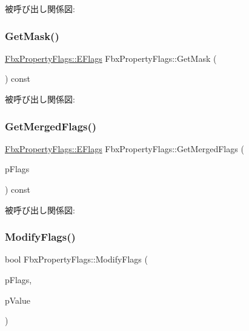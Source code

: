被呼び出し関係図\+:
\mbox{\label{class_fbx_property_flags_a041432d0cdbc9a1fd7c1b9b720cbf816}} 
\subsubsection{\texorpdfstring{Get\+Mask()}{GetMask()}}
{\footnotesize\ttfamily \hyperlink{class_fbx_property_flags_afabfa7e0949aac8a7dcdf8a141867e99}{Fbx\+Property\+Flags\+::\+E\+Flags} Fbx\+Property\+Flags\+::\+Get\+Mask (\begin{DoxyParamCaption}{ }\end{DoxyParamCaption}) const}

被呼び出し関係図\+:
\mbox{\label{class_fbx_property_flags_a20c4549ffb1167d35ba85a7d096b322c}} 
\subsubsection{\texorpdfstring{Get\+Merged\+Flags()}{GetMergedFlags()}}
{\footnotesize\ttfamily \hyperlink{class_fbx_property_flags_afabfa7e0949aac8a7dcdf8a141867e99}{Fbx\+Property\+Flags\+::\+E\+Flags} Fbx\+Property\+Flags\+::\+Get\+Merged\+Flags (\begin{DoxyParamCaption}\item[{\hyperlink{class_fbx_property_flags_afabfa7e0949aac8a7dcdf8a141867e99}{Fbx\+Property\+Flags\+::\+E\+Flags}}]{p\+Flags }\end{DoxyParamCaption}) const}

被呼び出し関係図\+:
\mbox{\label{class_fbx_property_flags_a639336bbcff51b3a39768be85f030fab}} 
\subsubsection{\texorpdfstring{Modify\+Flags()}{ModifyFlags()}}
{\footnotesize\ttfamily bool Fbx\+Property\+Flags\+::\+Modify\+Flags (\begin{DoxyParamCaption}\item[{\hyperlink{class_fbx_property_flags_afabfa7e0949aac8a7dcdf8a141867e99}{Fbx\+Property\+Flags\+::\+E\+Flags}}]{p\+Flags,  }\item[{bool}]{p\+Value }\end{DoxyParamCaption})}

